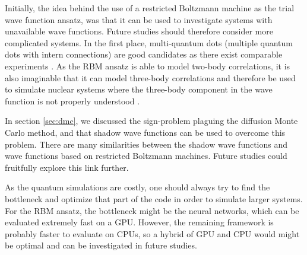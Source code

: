 Initially, the idea behind the use of a restricted Boltzmann machine as the trial wave function ansatz, was that it can be used to investigate systems with unavailable wave functions. Future studies should therefore consider more complicated systems. In the first place, multi-quantum dots (multiple quantum dots with intern connections) are good candidates as there exist comparable experiments \supercite{marzin_photoluminescence_1994,brunner_sharp-line_1994}. As the RBM ansatz is able to model two-body correlations, it is also imaginable that it can model three-body correlations and therefore be used to simulate nuclear systems where the three-body component in the wave function is not properly understood \supercite{sauer_three-nucleon_2014}.

In section \ref{sec:dmc}, we discussed the sign-problem plaguing the diffusion Monte Carlo method, and that shadow wave functions can be used to overcome this problem. There are many similarities between the shadow wave functions and wave functions based on restricted Boltzmann machines. Future studies could fruitfully explore this link further.

As the quantum simulations are costly, one should always try to find the bottleneck and optimize that part of the code in order to simulate larger systems. For the RBM ansatz, the bottleneck might be the neural networks, which can be evaluated extremely fast on a GPU. However, the remaining framework is probably faster to evaluate on CPUs, so a hybrid of GPU and CPU would might be optimal and can be investigated in future studies.